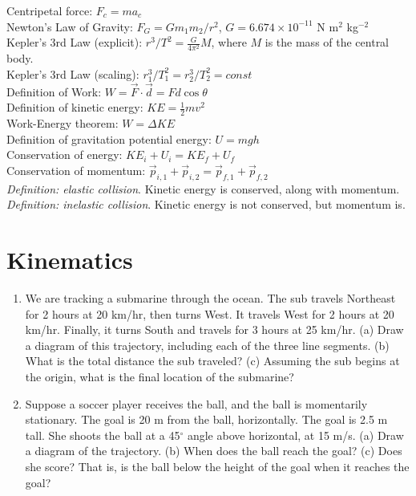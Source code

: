 \documentclass[10pt]{article}
\begin{document}
Centripetal force: $F_c = m a_c$ \\
Newton's Law of Gravity: $F_G = G m_1 m_2 / r^2$, $G = 6.674\times 10^{-11}$ N m$^2$ kg$^{-2}$ \\
Kepler's 3rd Law (explicit): $r^3/T^2 = \frac{G}{4\pi^2} M$, where $M$ is the mass of the central body. \\
Kepler's 3rd Law (scaling): $r_1^3/T_1^2 = r_2^3/T_2^2 = const$ \\
Definition of Work: $W = \vec{F} \cdot \vec{d} = Fd\cos\theta$ \\
Definition of kinetic energy: $KE = \frac{1}{2} mv^2$ \\
Work-Energy theorem: $W = \Delta KE$ \\
Definition of gravitation potential energy: $U = mgh$ \\
Conservation of energy: $KE_i + U_i = KE_f + U_f$ \\
Conservation of momentum: $\vec{p}_{i,1} + \vec{p}_{i,2} = \vec{p}_{f,1} + \vec{p}_{f,2}$ \\
\textit{Definition: elastic collision}. Kinetic energy is conserved, along with momentum. \\
\textit{Definition: inelastic collision}. Kinetic energy is not conserved, but momentum is. \\

\section{Kinematics}
\begin{enumerate}
\item We are tracking a submarine through the ocean.  The sub travels Northeast for 2 hours at 20 km/hr, then turns West.  It travels West for 2 hours at 20 km/hr.  Finally, it turns South and travels for 3 hours at 25 km/hr.  (a) Draw a diagram of this trajectory, including each of the three line segments.  (b) What is the total distance the sub traveled? (c) Assuming the sub begins at the origin, what is the final location of the submarine? \\ \vspace{3cm}
\clearpage
\item Suppose a soccer player receives the ball, and the ball is momentarily stationary.  The goal is 20 m from the ball, horizontally.  The goal is 2.5 m tall. She shoots the ball at a 45$^{\circ}$ angle above horizontal, at 15 m/s.  (a) Draw a diagram of the trajectory.  (b) When does the ball reach the goal? (c) Does she score? That is, is the ball below the height of the goal when it reaches the goal? \\ \vspace{2.5cm}
\end{enumerate}
\end{document}
